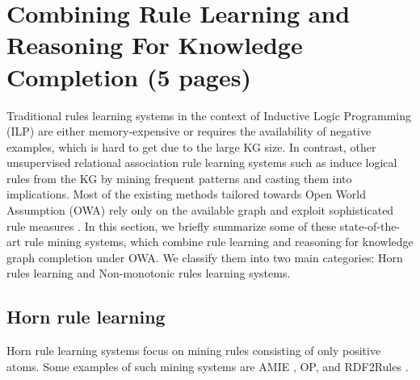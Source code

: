 \section{Combining Rule Learning and Reasoning For Knowledge Completion (5 pages)}
\label{sec:rules_kg_completion}
Traditional rules learning systems in the context of Inductive Logic Programming (ILP) \cite{probfoil,DBLP:conf/ijcai/RaedtDTBV15,DBLP:conf/clima/CorapiSIR11} are either memory-expensive or requires the availability of negative examples, which is hard to get due to the large KG size. In contrast, other unsupervised relational 
association rule learning systems such as \cite{DBLP:conf/esf/GoethalsB02,amie} induce logical rules from the KG by mining frequent patterns and casting them into implications. Most of the  existing methods tailored towards Open World Assumption (OWA) rely only on the available graph and exploit sophisticated rule measures \cite{amie,Chen:2016:OP:2882903.2882954, rumis}.
In this section, we briefly summarize some of these state-of-the-art rule mining systems, which combine rule learning and reasoning for knowledge graph completion under OWA. We classify them into two main categories: Horn rules learning and Non-monotonic rules learning systems.
\subsection{Horn rule learning}
Horn rule learning systems focus on mining rules consisting of only positive atoms. Some examples of such mining systems are AMIE \cite{}, OP, \cite{} and RDF2Rules \cite{}.
